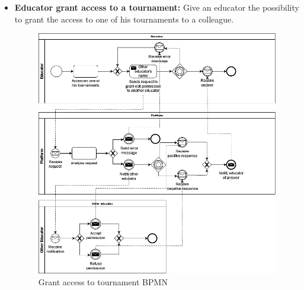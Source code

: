 \documentclass{article}
\begin{document}
{\begin{itemize}
    \item \textbf{Educator grant access to a tournament:} Give an educator the possibility to grant the access to one of his tournaments to a colleague.
          \begin{figure}[H]
              \centering
              \includegraphics[scale=0.4]{images/BPMN/BPMN10.png}
              \caption{Grant access to tournament BPMN}
              \label{fig:accessGrantTournamentBPMN}
          \end{figure}

          \newpage


\end{itemize}}
\end{document}
